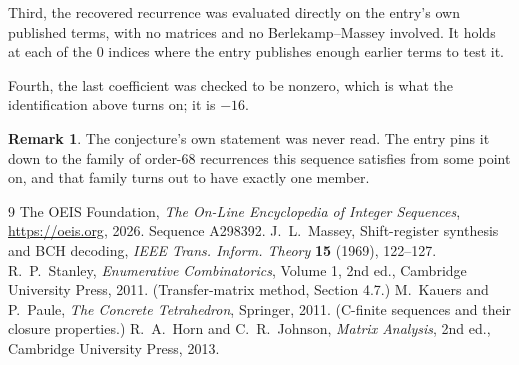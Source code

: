 \documentclass[11pt,a4paper]{article}
\theoremstyle{plain}
\theoremstyle{definition}
\newtheorem{remark}[theorem]{Remark}
\begin{document}
Third, the recovered recurrence was evaluated directly on the entry's own published terms, with
no matrices and no Berlekamp--Massey involved. It holds at each of the $0$ indices where
the entry publishes enough earlier terms to test it.

Fourth, the last coefficient was checked to be nonzero, which is what the identification above
turns on; it is $-16$.

\begin{remark}
The conjecture's own statement was never read. The entry pins it down to the family of
order-$68$ recurrences this sequence satisfies from some point on, and that family turns
out to have exactly one member.
\end{remark}

\begin{thebibliography}{9}
 The OEIS Foundation, \emph{The On-Line Encyclopedia of Integer
Sequences}, \url{https://oeis.org}, 2026. Sequence A298392.
 J.~L.~Massey, Shift-register synthesis and BCH decoding, \emph{IEEE
Trans. Inform. Theory} \textbf{15} (1969), 122--127.
 R.~P.~Stanley, \emph{Enumerative Combinatorics}, Volume 1, 2nd ed.,
Cambridge University Press, 2011. (Transfer-matrix method, Section 4.7.)
 M.~Kauers and P.~Paule, \emph{The Concrete Tetrahedron}, Springer, 2011.
(C-finite sequences and their closure properties.)
 R.~A.~Horn and C.~R.~Johnson, \emph{Matrix Analysis}, 2nd ed., Cambridge
University Press, 2013.
\end{thebibliography}
\end{document}
